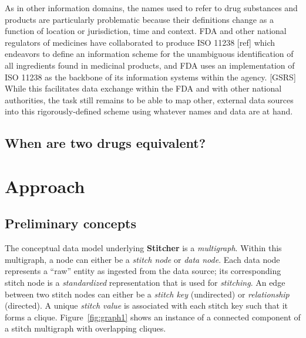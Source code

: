 \documentclass{bioinfo}
\newcommand\st{\textbf{Stitcher}}
\begin{document}
As in other information domains, the names used to refer to drug substances and products are particularly problematic because their definitions change as a function of location or jurisdiction, time and context. FDA and other national regulators of medicines have collaborated to produce ISO 11238 [ref] which endeavors to define an information scheme for the unambiguous identification of all ingredients found in medicinal products, and FDA uses an implementation of ISO 11238 as the backbone of its information systems within the agency. [GSRS] While this facilitates data exchange within the FDA and with other national authorities, the task still remains to be able to map other, external data sources into this rigorously-defined scheme using whatever names and data are at hand.

\subsection{When are two drugs equivalent?}


\section{Approach}

\subsection{Preliminary concepts}
The conceptual data model underlying \st{} is a \emph{multigraph}. Within this multigraph, a node can either be a \emph{stitch node} or \emph{data node}. Each data node represents a ``raw'' entity as ingested from the data source; its corresponding stitch node is a \emph{standardized} representation that is used for \emph{stitching}. An edge between two stitch nodes can either be a \emph{stitch key} (undirected) or \emph{relationship} (directed). A unique \emph{stitch value} is associated with each stitch key such that it forms a clique. Figure~\ref{fig:graph1} shows an instance of a connected component of a stitch multigraph with overlapping cliques.
\end{document}
